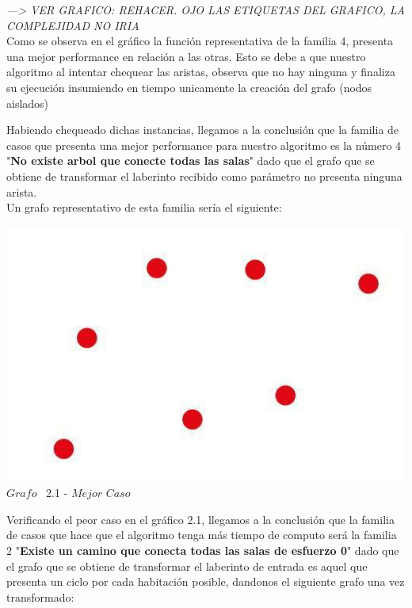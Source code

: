 \textit{---> VER GRAFICO: REHACER. OJO LAS ETIQUETAS DEL GRAFICO, LA COMPLEJIDAD NO IRIA}\\

Como se observa en el gr\'afico la funci\'on representativa de la familia 4, presenta una mejor performance en relaci\'on a las otras. Esto se debe a que nuestro algoritmo al intentar chequear las aristas, observa que no hay ninguna y finaliza su ejecuci\'on insumiendo en tiempo unicamente la creaci\'on del grafo (nodos aislados)

Habiendo chequeado dichas instancias, llegamos a la conclusi\'on que la familia de casos que presenta una mejor performance para nuestro algoritmo
es la número 4 "\textbf{No existe arbol que conecte todas las salas}" dado que el grafo que se obtiene de transformar el laberinto recibido como par\'ametro no presenta ninguna arista.\\

Un grafo representativo de esta familia ser\'ia el siguiente:

\vspace*{0.3cm} \vspace*{0.3cm}
  \begin{center}
 \includegraphics[scale=0.5]{./EJ2/grafoSinEjes.jpeg}
 \\{$Grafo$ \ 2.1 - $Mejor$ $Caso$}
  \end{center}
  \vspace*{0.3cm}

Verificando el peor caso en el gráfico 2.1, llegamos a la conclusi\'on que la familia de casos que hace que el algoritmo tenga más tiempo de computo ser\'a la familia 2 "\textbf{Existe un camino que conecta todas las salas de esfuerzo 0}" dado que el grafo que se obtiene de transformar el laberinto de entrada es aquel que presenta un ciclo por cada habitaci\'on posible, dandonos el siguiente grafo una vez transformado:\\

